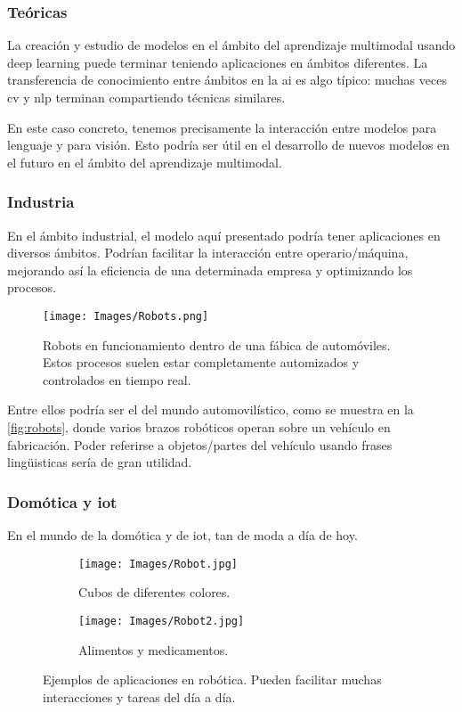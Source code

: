 \subsubsection{Teóricas}
La creación y estudio de modelos en el ámbito del aprendizaje multimodal usando
deep learning puede terminar teniendo aplicaciones en ámbitos diferentes. La
transferencia de conocimiento entre ámbitos en la \gls{ai} es algo típico:
muchas veces \gls{cv} y \gls{nlp} terminan compartiendo técnicas similares.

En este caso concreto, tenemos precisamente la interacción entre modelos para
lenguaje y para visión. Esto podría ser útil en el desarrollo de nuevos modelos
en el futuro en el ámbito del aprendizaje multimodal.

\subsubsection{Industria}
En el ámbito industrial, el modelo aquí presentado podría tener aplicaciones en
diversos ámbitos. Podrían facilitar la interacción entre operario/máquina,
mejorando así la eficiencia de una determinada empresa y optimizando los
procesos.

\begin{figure}[ht]
  \centering
  \texttt{[image: Images/Robots.png]}
  \caption[Robots en fábrica de automóviles]{Robots en funcionamiento dentro de
  una fábica de automóviles. Estos procesos suelen estar completamente
  automizados y controlados en tiempo real.}
  \label{fig:robots}
\end{figure}

Entre ellos podría ser el del mundo automovilístico, como se
muestra en la \vref{fig:robots}, donde varios brazos robóticos operan sobre un
vehículo en fabricación. Poder referirse a objetos/partes del vehículo usando
frases lingüisticas sería de gran utilidad.

\subsubsection{Domótica y \acrshort*{iot}}
En el mundo de la domótica y de \gls{iot}, tan de moda a día de hoy.

\begin{figure}[ht]
  \centering
  \begin{subfigure}[b]{.55\textwidth}
    \centering
    \texttt{[image: Images/Robot.jpg]}
    \caption{Cubos de diferentes colores.}
  \end{subfigure}\hfill
  \begin{subfigure}[b]{.4\textwidth}
    \centering
    \texttt{[image: Images/Robot2.jpg]}
    \caption{Alimentos y medicamentos.}
  \end{subfigure}
  \caption[Ejemplos de aplicaciones en robótica]{Ejemplos de aplicaciones en
    robótica. Pueden facilitar muchas interacciones y tareas del día a día.}
  \label{fig:robot}
\end{figure}


